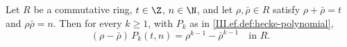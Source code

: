 Let $R$ be a commutative ring, $t\in\Z$, $n\in\N$, and let $\rho,\bar\rho\in R$ satisfy $\rho+\bar\rho=t$ and $\rho\bar\rho=n$. Then for every $k\ge1$,
with $P_k$ as in \cref{III.ef.def:hecke-polynomial},
\[
  (\rho-\bar\rho)\,P_k(t,n)=\rho^{k-1}-\bar\rho^{k-1}\quad\text{in }R.
\]

